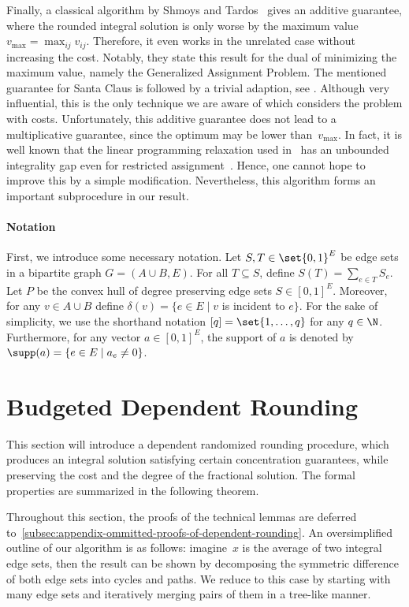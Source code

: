 \documentclass[a4paper,USenglish,cleveref,thm-restate]{lipics-v2021}
\begin{document}
Finally, a classical algorithm by Shmoys and Tardos~\cite{ShmoysT93}
gives an additive guarantee, where the rounded integral solution
is only worse by the maximum value $v_{\max} = \max_{ij} v_{ij}$.
Therefore, it even works in the unrelated case without increasing
the cost. Notably, they state this result for
the dual of minimizing the maximum value, namely the Generalized Assignment Problem.
The mentioned guarantee for Santa Claus is followed by a trivial
adaption, see .
Although very influential, this is the only technique we are
aware of which considers the problem with costs.
Unfortunately, this additive guarantee does not lead
to a multiplicative guarantee, since the optimum may be lower
than~$v_{\max}$. In fact, it is well known that the linear 
programming relaxation used in~\cite{ShmoysT93} has an unbounded
integrality gap even for restricted assignment~\cite{BansalS06}. Hence, one
cannot hope to improve this by a simple modification.
Nevertheless, this algorithm forms an important subprocedure in our result.

\paragraph*{Notation}


First, we introduce some necessary notation. Let $S,T \in \set{0,1}^E$ be edge sets in a bipartite graph $G = (A\cup B, E)$.
For all $T \subseteq S$, define $S(T) = \sum_{e \in T} S_e$. 
Let $P$ be the convex hull of degree preserving edge sets $S \in [0,1]^E$. Moreover, for any $v \in A\cup B$ define $\delta(v) = \{e \in E \mid v$ is incident to $e\}$. For the sake of simplicity, we use the shorthand notation $[q] = \set{1, \dotsc, q}$ for any $q \in \N$. Furthermore, for any vector $a \in [0, 1]^E$, the support of $a$ is denoted by $\supp(a) = \{e \in E \mid a_e \neq 0 \}$. \section{Budgeted Dependent Rounding}
\label{sec:dependent-randomized-rounding}

This section will introduce a dependent randomized rounding procedure,
which produces an integral solution satisfying certain concentration guarantees, while preserving the cost and the degree of the fractional solution.
The formal properties are summarized in the following theorem.

\RDR*
\medskip

Throughout this section, the proofs of the technical lemmas are deferred to~\cref{subsec:appendix-ommitted-proofs-of-dependent-rounding}.
An oversimplified outline of our algorithm is as follows:
imagine~$x$ is
the average of two integral edge sets, then
the result can be shown by decomposing the
symmetric difference of both edge sets into cycles and paths.
We reduce to this case by starting with many edge sets and iteratively merging pairs of them in
a tree-like manner.
\end{document}
